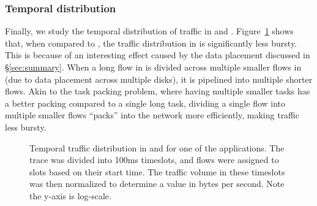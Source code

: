 \subsubsection{Temporal distribution}
Finally, we study the temporal distribution of traffic in \dis and \pdis. Figure~\ref{fig:td} shows that, when compared to \pdis, the traffic distribution in \dis is significantly less bursty. This is because of an interesting effect caused by the data placement discussed in \S\ref{sec:summary}. When a long flow in \pdis is divided across multiple smaller flows in \dis (due to data placement across multiple disks), it is pipelined into multiple shorter flows. Akin to the task packing problem, where having multiple smaller tasks has a better packing compared to a single long task, dividing a single flow into multiple smaller flows ``packs'' into the network more efficiently, making traffic less bursty.
%
\begin{figure}[t]
  \centering
  \caption{\small{Temporal traffic distribution in \dis and \pdis for one of the applications. The trace was divided into 100ms timeslots, and flows were assigned to slots based on their start time. The traffic volume in these timeslots was then normalized to determine a value in bytes per second. Note the y-axis is log-scale.}}
  \label{fig:td}
\end{figure}
%


